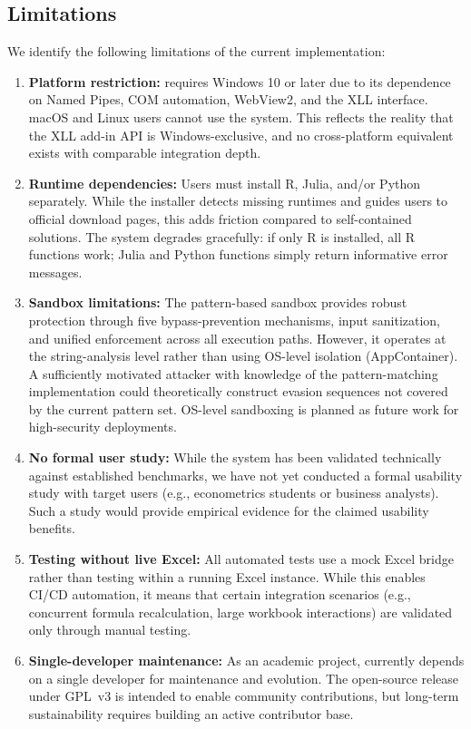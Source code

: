 \subsection{Limitations}
\label{sec:limitations}

We identify the following limitations of the current implementation:

\begin{enumerate}
    \item \textbf{Platform restriction:} \neven{} requires Windows 10 or later due to its dependence on Named Pipes, COM automation, WebView2, and the XLL interface. macOS and Linux users cannot use the system. This reflects the reality that the XLL add-in API is Windows-exclusive, and no cross-platform equivalent exists with comparable integration depth.

    \item \textbf{Runtime dependencies:} Users must install R, Julia, and/or Python separately. While the \neven{} installer detects missing runtimes and guides users to official download pages, this adds friction compared to self-contained solutions. The system degrades gracefully: if only R is installed, all R functions work; Julia and Python functions simply return informative error messages.

    \item \textbf{Sandbox limitations:} The pattern-based sandbox provides robust protection through five bypass-prevention mechanisms, input sanitization, and unified enforcement across all execution paths. However, it operates at the string-analysis level rather than using OS-level isolation (AppContainer). A sufficiently motivated attacker with knowledge of the pattern-matching implementation could theoretically construct evasion sequences not covered by the current pattern set. OS-level sandboxing is planned as future work for high-security deployments.

    \item \textbf{No formal user study:} While the system has been validated technically against established benchmarks, we have not yet conducted a formal usability study with target users (e.g., econometrics students or business analysts). Such a study would provide empirical evidence for the claimed usability benefits.

    \item \textbf{Testing without live Excel:} All automated tests use a mock Excel bridge rather than testing within a running Excel instance. While this enables CI/CD automation, it means that certain integration scenarios (e.g., concurrent formula recalculation, large workbook interactions) are validated only through manual testing.

    \item \textbf{Single-developer maintenance:} As an academic project, \neven{} currently depends on a single developer for maintenance and evolution. The open-source release under GPL~v3 is intended to enable community contributions, but long-term sustainability requires building an active contributor base.
\end{enumerate}

